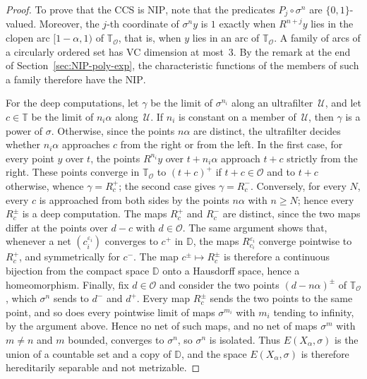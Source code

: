 \documentclass[psamsfonts]{amsart}
\theoremstyle{definition}
\theoremstyle{remark}
\newcommand{\NIP}{\text{NIP}}
\numberwithin{equation}{section}
\begin{document}
\begin{proof}
To prove that the CCS is $\NIP$, note that the predicates $P_j\circ\sigma^n$ are $\{0,1\}$-valued.
Moreover, the $j$-th coordinate of $\sigma^n y$ is $1$ exactly when $R^{n+j}y$ lies in the clopen arc $[1-\alpha,1)$ of $\mathbb{T}_{\mathcal{O}}$, that is, when $y$ lies in an arc of $\mathbb{T}_{\mathcal{O}}$.
A family of arcs of a circularly ordered set has VC dimension at most~$3$.
By the remark at the end of Section~\ref{sec:NIP-poly-exp}, the characteristic functions of the members of such a family therefore have the $\NIP$.

For the deep computations, let $\gamma$ be the limit of $\sigma^{n_i}$ along an
ultrafilter~$\mathcal{U}$, and let $c\in\mathbb{T}$ be the limit of $n_i\alpha$ along~$\mathcal{U}$.
If $n_i$ is constant on a member of~$\mathcal{U}$, then $\gamma$ is a power of $\sigma$.
Otherwise, since the points $n\alpha$ are distinct, the ultrafilter decides
whether $n_i\alpha$ approaches $c$ from the right or from the left.
In the first case, for every point $y$ over $t$, the points $R^{n_i}y$ over
$t+n_i\alpha$ approach $t+c$ strictly from the right.
These points converge in $\mathbb{T}_{\mathcal{O}}$ to $(t+c)^+$ if $t+c\in \mathcal{O}$ and to $t+c$ otherwise, whence $\gamma=R_c^+$;
the second case gives $\gamma=R_c^-$.
Conversely, for every $N$, every $c$ is approached from both sides by the points $n\alpha$
with $n\ge N$;
hence every $R_c^\pm$ is a deep computation.
The maps $R_c^+$ and $R_c^-$ are distinct, since the two maps differ at the points over $d-c$ with $d\in \mathcal{O}$.
The same argument shows that, whenever a net $(c_i^{\varepsilon_i})$ converges to $c^+$ in $\mathbb{D}$, the maps
$R_{c_i}^{\varepsilon_i}$ converge pointwise to $R_c^+$, and symmetrically for $c^-$.
The map $c^\pm\mapsto R_c^\pm$ is therefore a continuous bijection from the compact space
$\mathbb{D}$ onto a Hausdorff space, hence a homeomorphism.
Finally, fix $d\in \mathcal{O}$ and consider the two points
$(d-n\alpha)^\pm$ of $\mathbb{T}_{\mathcal{O}}$, which $\sigma^n$ sends to $d^-$ and $d^+$.
Every map $R_c^\pm$ sends the two points to the same point, and so does every pointwise
limit of maps $\sigma^{m_i}$ with $m_i$ tending to infinity, by the argument above.
Hence no net of such maps, and no net of maps $\sigma^m$ with $m\ne n$ and $m$ bounded, converges to $\sigma^n$, so $\sigma^n$ is isolated.
Thus $E(X_\alpha,\sigma)$ is the union of a countable set and a copy of
$\mathbb{D}$, and the space $E(X_\alpha,\sigma)$ is therefore hereditarily separable and not metrizable.
\end{proof}
\end{document}

